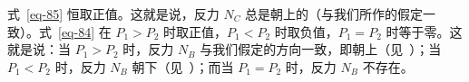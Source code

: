 \begin{dialogue}
\tchr 式~\eqref{eq-85} 恒取正值。这就是说，反力 $N_{C}$ 总是朝上的（与我们所作的假定一致）。式~\eqref{eq-84} 在 $P_{1}>P_{2}$ 时取正值，$P_{1}<P_{2}$ 时取负值，$P_{1}=P_{2}$ 时等于零。这就是说：当 $P_{1}>P_{2}$ 时，反力 $N_{B}$ 与我们假定的方向一致，即朝上（见~）；当 $P_{1}<P_{2}$ 时，反力 $N_{B}$ 朝下（见~）；而当 $P_{1}=P_{2}$ 时，反力 $N_{B}$ 不存在。

\end{dialogue}


\cleardoublepage

